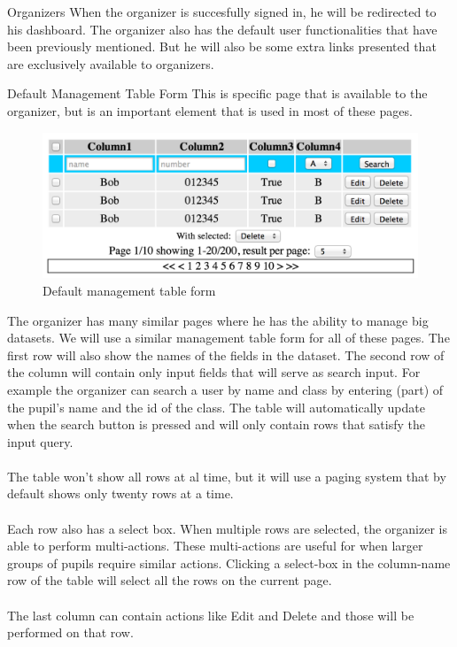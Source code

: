 \begin{section}{Organizers}
	When the organizer is succesfully signed in, he will be redirected to his dashboard.
	The organizer also has the default user functionalities that have been previously
	mentioned. But he will also be some extra links presented that are exclusively
	available to organizers.

	\begin{subsection}{Default Management Table Form}
		This is specific page that is available to the organizer, but is an important
		element that is used in most of these pages.
		\begin{figure}[h]
		  \centering
			\includegraphics[width=1\textwidth]{img/default_managment_form.png}
		  \caption{Default management table form}
		  \label{default_management_table_form}
		\end{figure}
		The organizer has many similar pages where he has the ability to manage big datasets.
		We will use a similar management table form for all of these pages.
		The first row will also show the names of the fields in the dataset.
		The second row of the column will contain only input fields that will serve as
		search input. For example the organizer can search a user by name and class by
		entering (part) of the pupil's name and the id of the class. The table will
		automatically update when the search button is pressed and will only contain
		rows that satisfy the input query.
		\\
		\\
		The table won't show all rows at al time, but it will use a paging system that
		by default shows only twenty rows at a time.\\
		\\
		Each row also has a select box. When multiple rows are selected, the organizer is
		able to perform multi-actions.
		These multi-actions are useful for when larger groups of pupils require similar
		actions. Clicking a select-box in the column-name row of the table will select
		all the rows on the current page.\\
		\\
		The last column can contain actions like Edit and Delete and those will be
		performed on that row.
	\end{subsection}
	

\end{section}

